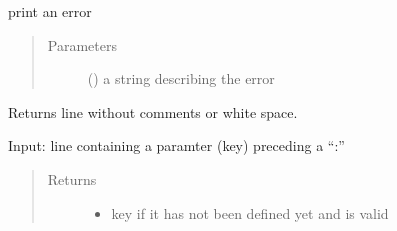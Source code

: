 \documentclass[letterpaper,10pt,english]{sphinxmanual}
\begin{document}
\begin{fulllineitems}
\begin{fulllineitems}
\end{fulllineitems}


\begin{fulllineitems}
\label{\detokenize{pydfnworks:pydfnworks.dfnGen.gen_input.input_helper.error}}
print an error
\begin{quote}\begin{description}
\item[{Parameters}] \leavevmode
{} () \textendash{} a string describing the error

\end{description}\end{quote}

\end{fulllineitems}


\begin{fulllineitems}
\label{\detokenize{pydfnworks:pydfnworks.dfnGen.gen_input.input_helper.extract_parameters}}
Returns line without comments or white space.

\end{fulllineitems}


\begin{fulllineitems}
\label{\detokenize{pydfnworks:pydfnworks.dfnGen.gen_input.input_helper.find_key}}
Input: line containing a paramter (key) preceding a “:”
\begin{quote}\begin{description}
\item[{Returns}] \leavevmode
\begin{itemize}
\item {} 
key \textendash{} if it has not been defined yet and is valid


\end{itemize}
\end{description}
\end{quote}
\end{fulllineitems}
\end{fulllineitems}
\end{document}
